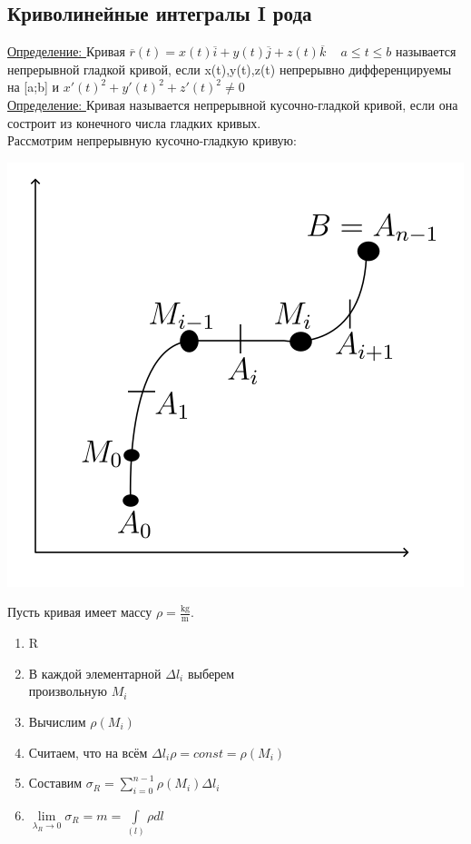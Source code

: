 \documentclass[12pt]{article}
\let\ORIincludegraphics\includegraphics
\renewcommand{\includegraphics}[2][]{\ORIincludegraphics[scale=0.65,#1]{#2}}
\let\oldint\int
\let\oldsum\sum
\let\oldlim\lim
\renewcommand{\int}{\oldint\limits}
\renewcommand{\sum}{\oldsum\limits}
\renewcommand{\lim}{\oldlim\limits}
\begin{document}
  \subsection{Криволинейные интегралы I рода}
  \underline{Определение: } Кривая $\overline{r}(t)=x(t)\overline{i}+y(t)\overline{j}+z(t)\overline{k} \hspace{10pt}$
  $a \leq t \leq b$ называется непрерывной гладкой кривой, если x(t),y(t),z(t) непрерывно дифференцируемы
  на [a;b] и $x'(t)^2+y'(t)^2+z'(t)^2 \not = 0$\\
  \underline{Определение: } Кривая называется непрерывной кусочно-гладкой кривой, если она состроит из конечного числа
  гладких кривых.\\
  Рассмотрим непрерывную кусочно-гладкую кривую:\\
  \begin{minipage}{0.45\textwidth} %
      \includegraphics[width=\linewidth]{8.1.1.png}
  \end{minipage}%
  \hspace{1em} %
  \begin{minipage}{0.65\textwidth} %
      Пусть кривая имеет массу $\rho=\frac{\mathrm{kg}}{\mathrm{m}}$.
      \begin{enumerate}
        \item R
        \item В каждой элементарной $\Delta l_i$ выберем\\ произвольную $M_i$ 
        \item Вычислим $\rho(M_i)$
        \item Считаем, что на всём $\Delta l_i \rho=const=\rho(M_i)$
        \item Составим $\sigma_R=\sum_{i=0}^{n-1}\rho(M_i)\Delta l_i$
        \item $\lim_{\lambda_R \to 0} \sigma_R = m = \int_{(l)} \rho dl$
      \end{enumerate}
  \end{minipage}
\end{document}

